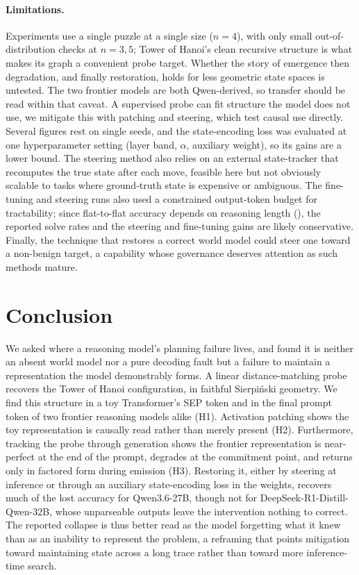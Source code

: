 \documentclass{article} %
\begin{document}
\paragraph{Limitations.}
Experiments use a single puzzle at a single size ($n{=}4$), with only small out-of-distribution checks at $n{=}3,5$; Tower of Hanoi's clean recursive structure is what makes its graph a convenient probe target. Whether the story of emergence then degradation, and finally restoration, holds for less geometric state spaces is untested. The two frontier models are both Qwen-derived, so transfer should be read within that caveat. A supervised probe can fit structure the model does not use, we mitigate this with patching and steering, which test causal use directly. Several figures rest on single seeds, and the state-encoding loss was evaluated at one hyperparameter setting (layer band, $\alpha$, auxiliary weight), so its gains are a lower bound. The steering method also relies on an external state-tracker that recomputes the true state after each move, feasible here but not obviously scalable to tasks where ground-truth state is expensive or ambiguous. The fine-tuning and steering runs also used a constrained output-token budget for tractability; since flat-to-flat accuracy depends on reasoning length (), the reported solve rates and the steering and fine-tuning gains are likely conservative. Finally, the technique that restores a correct world model could steer one toward a non-benign target, a capability whose governance deserves attention as such methods mature.

\section{Conclusion}
\label{sec:conclusion}

We asked where a reasoning model's planning failure lives, and found it is neither an absent world model nor a pure decoding fault but a failure to maintain a representation the model demonstrably forms. A linear distance-matching probe recovers the Tower of Hanoi configuration, in faithful Sierpi\'nski geometry. We find this structure in a toy Transformer's SEP token and in the final prompt token of two frontier reasoning models alike (H1). Activation patching shows the toy representation is causally read rather than merely present (H2). Furthermore, tracking the probe through generation shows the frontier representation is near-perfect at the end of the prompt, degrades at the commitment point, and returns only in factored form during emission (H3). Restoring it, either by steering at inference or through an auxiliary state-encoding loss in the weights, recovers much of the lost accuracy for Qwen3.6-27B, though not for DeepSeek-R1-Distill-Qwen-32B, whose unparseable outputs leave the intervention nothing to correct. The reported collapse is thus better read as the model forgetting what it knew than as an inability to represent the problem, a reframing that points mitigation toward maintaining state across a long trace rather than toward more inference-time search.
\end{document}
